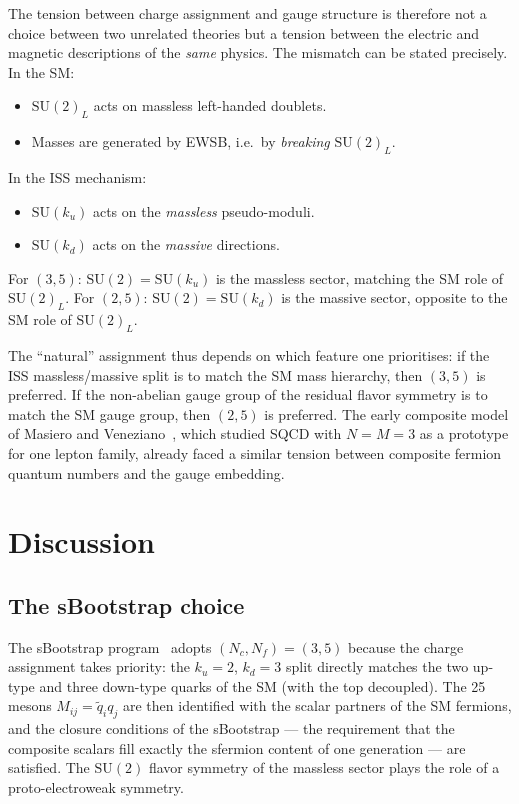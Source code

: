 \documentclass[11pt,a4paper]{article}
\newcommand{\Nf}{N_{\!f}}
\newcommand{\Nc}{N_{\!c}}
\begin{document}
The tension between charge assignment and gauge structure is
therefore not a choice between two unrelated theories but a tension
between the electric and magnetic descriptions of the \emph{same}
physics.  The mismatch can be stated precisely.
In the SM:
\begin{itemize}
\item $\mathrm{SU}(2)_L$ acts on massless left-handed doublets.
\item Masses are generated by EWSB, i.e.\ by \emph{breaking}
  $\mathrm{SU}(2)_L$.
\end{itemize}
In the ISS mechanism:
\begin{itemize}
\item $\mathrm{SU}(k_u)$ acts on the \emph{massless} pseudo-moduli.
\item $\mathrm{SU}(k_d)$ acts on the \emph{massive} directions.
\end{itemize}
For $(3,5)$: $\mathrm{SU}(2) = \mathrm{SU}(k_u)$ is the massless
sector, matching the SM role of $\mathrm{SU}(2)_L$.
For $(2,5)$: $\mathrm{SU}(2) = \mathrm{SU}(k_d)$ is the massive
sector, opposite to the SM role of $\mathrm{SU}(2)_L$.

The ``natural'' assignment thus depends on which feature one
prioritises: if the ISS massless/massive split is to match the SM
mass hierarchy, then $(3,5)$ is preferred.  If the non-abelian gauge
group of the residual flavor symmetry is to match the SM gauge group,
then $(2,5)$ is preferred.
The early composite model of Masiero and
Veneziano~\cite{MasieroVeneziano1985}, which studied SQCD with
$N = M = 3$ as a prototype for one lepton family, already faced a
similar tension between composite fermion quantum numbers and the
gauge embedding.


\section{Discussion}
\label{sec:discussion}

\subsection{The sBootstrap choice}

The sBootstrap program~\cite{Rivero2024} adopts $(\Nc,\Nf) = (3,5)$
because the charge assignment takes priority: the $k_u = 2$,
$k_d = 3$ split directly matches the two up-type and three down-type
quarks of the SM (with the top decoupled).
The 25 mesons $M_{ij} = \tilde q_i q_j$ are then identified with
the scalar partners of the SM fermions, and the closure conditions
of the sBootstrap --- the requirement that the composite scalars fill
exactly the sfermion content of one generation --- are satisfied.
The $\mathrm{SU}(2)$ flavor symmetry of the massless sector plays
the role of a proto-electroweak symmetry.
\end{document}
